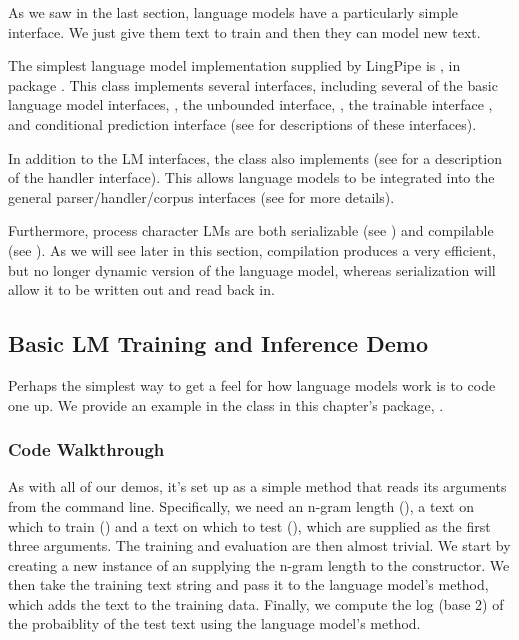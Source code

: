As we saw in the last section, language models have a particularly
simple interface.  We just give them text to train and then they
can model new text. 

The simplest language model implementation supplied by LingPipe is
, in package .  This class
implements several interfaces, including several of the basic language
model interfaces, , the unbounded interface,
, the trainable interface
, and conditional prediction interface
 (see  for descriptions
of these interfaces).

In addition to the LM interfaces, the  class also
implements  (see
 for a description of the handler interface).
This allows language models to be integrated into the general
parser/handler/corpus interfaces (see  for more
details).

Furthermore, process character LMs are both serializable (see
) and compilable (see
).  As we will see later in this section,
compilation produces a very efficient, but no longer dynamic
version of the language model, whereas serialization will allow
it to be written out and read back in.


\subsection{Basic LM Training and Inference Demo}

Perhaps the simplest way to get a feel for how language models work is
to code one up.  We provide an example in the class
 in this chapter's package,
.  

\subsubsection{Code Walkthrough}

As with all of our demos, it's set up as a simple  method
that reads its arguments from the command line.  Specifically, we need
an n-gram length (), a text on which to train
() and a text on which to test (),
which are supplied as the first three arguments.  The training and
evaluation are then almost trivial.
%
%
We start by creating a new instance of an 
supplying the n-gram length to the constructor.  We then take the
training text string and pass it to the language model's
 method, which adds the text to the
training data.  Finally, we compute the log (base 2) of the
probaiblity of the test text using the language model's
 method.  

